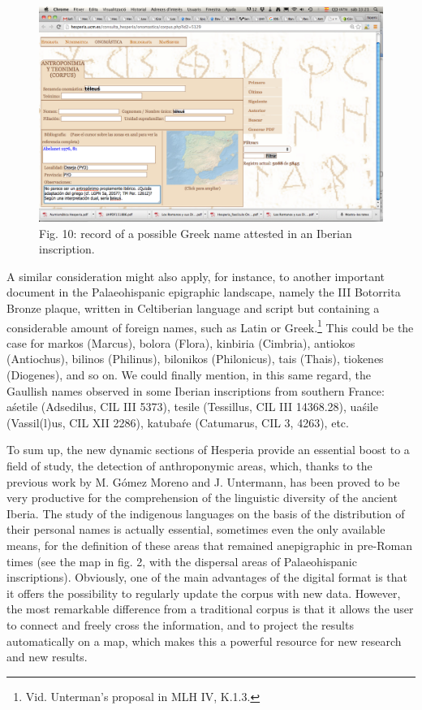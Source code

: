\documentclass[amsthm,ebook]{saparticle}
\begin{document}
\begin{figure}[!bp]
\centering
 \includegraphics[width=\columnwidth]{EpigraphyandonomasticsinHesperiadatabanktemplate-img010.png}
\caption{Fig. 10: record of a possible Greek name attested in an Iberian inscription.}
\label{fig:10}
\end{figure}
 



A similar consideration might also apply, for instance, to another important document in the Palaeohispanic epigraphic
landscape, namely the III Botorrita Bronze plaque, written in Celtiberian language and script but containing a
considerable amount of foreign names, such as Latin or Greek.\footnote{ Vid. Unterman’s proposal in MLH IV, K.1.3. }
This could be the case for markos (Marcus), bolora (Flora), kinbiria (Cimbria), antiokos (Antiochus), bilinos
(Philinus), bilonikos (Philonicus), tais (Thais), tiokenes (Diogenes), and so on. We could finally mention, in this
same regard, the Gaullish names observed in some Iberian inscriptions from southern France: aśetile (Adsedilus, CIL III
5373), tesile (Tessillus, CIL III 14368.28), uaśile (Vassil(l)us, CIL XII 2286), katubaŕe (Catumarus, CIL 3, 4263),
etc.

To sum up, the new dynamic sections of Hesperia provide an essential boost to a field of study, the detection of
anthroponymic areas, which, thanks to the previous work by M. Gómez Moreno and J. Untermann, has been proved to be very
productive for the comprehension of the linguistic diversity of the ancient Iberia. The study of the indigenous
languages on the basis of the distribution of their personal names is actually essential, sometimes even the only
available means, for the definition of these areas that remained anepigraphic in pre-Roman times (see the map in fig.
2, with the dispersal areas of Palaeohispanic inscriptions). Obviously, one of the main advantages of the digital
format is that it offers the possibility to regularly update the corpus with new data. However, the most remarkable
difference from a traditional corpus is that it allows the user to connect and freely cross the information, and to
project the results automatically on a map, which makes this a powerful resource for new research and new results.
\end{document}
